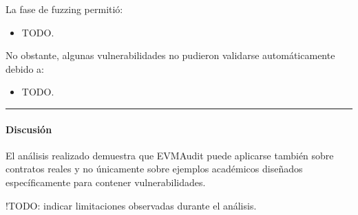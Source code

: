 La fase de fuzzing permitió:

\begin{itemize}
\tightlist
\item
  TODO.
\end{itemize}

No obstante, algunas vulnerabilidades no pudieron validarse
automáticamente debido a:

\begin{itemize}
\tightlist
\item
  TODO.
\end{itemize}

\begin{center}\rule{0.5\linewidth}{0.5pt}\end{center}

\paragraph{Discusión}\label{discusiuxf3n-2}

El análisis realizado demuestra que EVMAudit puede aplicarse también
sobre contratos reales y no únicamente sobre ejemplos académicos
diseñados específicamente para contener vulnerabilidades.

!TODO: indicar limitaciones observadas durante el análisis.

